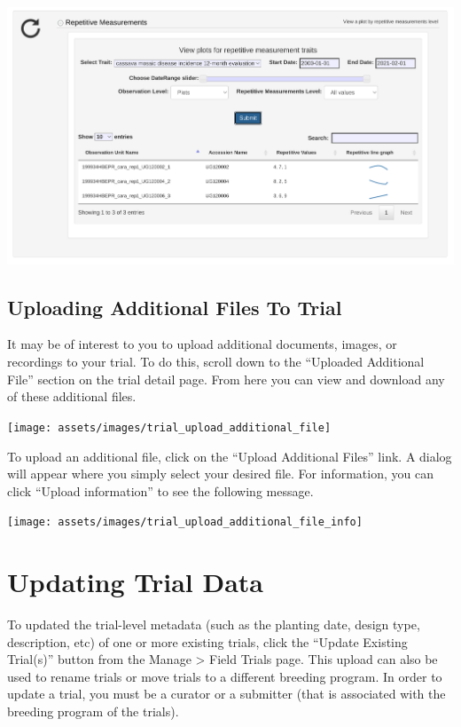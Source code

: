 \documentclass[
  12pt,
]{book}
\begin{document}
\begin{center}\includegraphics[width=0.95\linewidth]{assets/images/trial_detail_page_view_repetitive_measurements} \end{center}

\hypertarget{uploading-additional-files-to-trial}{%
\subsection{Uploading Additional Files To Trial}\label{uploading-additional-files-to-trial}}

It may be of interest to you to upload additional documents, images, or recordings to your trial. To do this, scroll down to the ``Uploaded Additional File'' section on the trial detail page. From here you can view and download any of these additional files.

\begin{center}\texttt{[image: assets/images/trial\_upload\_additional\_file]} \end{center}

To upload an additional file, click on the ``Upload Additional Files'' link. A dialog will appear where you simply select your desired file. For information, you can click ``Upload information'' to see the following message.

\begin{center}\texttt{[image: assets/images/trial\_upload\_additional\_file\_info]} \end{center}

\hypertarget{updating-trial-data}{%
\section{Updating Trial Data}\label{updating-trial-data}}

To updated the trial-level metadata (such as the planting date, design type, description, etc) of one or more existing trials, click the ``Update Existing Trial(s)'' button from the Manage \textgreater{} Field Trials page. This upload can also be used to rename trials or move trials to a different breeding program. In order to update a trial, you must be a curator or a submitter (that is associated with the breeding program of the trials).
\end{document}
